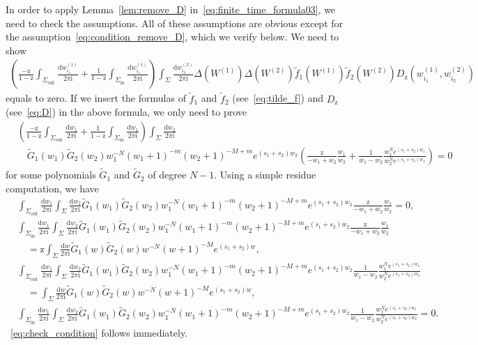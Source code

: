 \documentclass{article}
\numberwithin{equation}{section}
\newcommand{\ddbar}[2]{\frac{{\mathrm d}#1}{2\pi {\mathrm i}#2}}
\newcommand{\inn}{\mathrm{in}}
\newcommand{\out}{\mathrm{out}}
\newcommand{\rz}{\mathrm{z}}
\begin{document}
In order to apply Lemma~\ref{lem:remove_D} in~\eqref{eq:finite_time_formula03}, we need to check the assumptions. All of these assumptions are obvious except for the assumption~\eqref{eq:condition_remove_D}, which we verify below. We need to show
\begin{equation*}
	\begin{split}
	\left( \frac{-\rz}{1-\rz} \int_{\Sigma_{\out}}
	\ddbar{w_{i_1}^{(1)}}{}
	+\frac{1}{1-\rz}  \int_{\Sigma_{\inn}}
	\ddbar{w_{i_1}^{(1)}}{}
	\right)
	\int_{\Sigma} \ddbar{w_{i_2}^{(2)}}{}
	\Delta\left(W^{(1)}\right)
	\Delta\left(W^{(2)}\right)
	\tilde f_1\left( W^{(1)} \right)
	\tilde f_2\left( W^{(2)} \right)
	D_\rz\left(w_{i_1}^{(1)},w_{i_2}^{(2)}\right)
	\end{split}
\end{equation*}
equals to zero. If we insert the formulas of $\tilde f_1$ and $\tilde f_2$ (see~\eqref{eq:tilde_f}) and $D_\rz$ (see~\eqref{eq:D}) in the above formula, we only need to prove
\begin{equation}
	\label{eq:check_condition}
	\begin{split}
	&\left( \frac{-\rz}{1-\rz} \int_{\Sigma_{\out}}
	\ddbar{w_{1}}{}
	+\frac{1}{1-\rz}  \int_{\Sigma_{\inn}}
	\ddbar{w_1}{}
	\right)
	\int_{\Sigma} \ddbar{w_2}{}\\
	&\quad 
	\tilde G_1(w_1)\tilde G_2(w_2)
	w_1^{-N}(w_1+1)^{-m}
	(w_2+1)^{-M+m}e^{(s_1+s_2)w_2}	
	\left(
	\frac{ \rz } {-w_1+w_2}
	\frac{ w_1 } { w_2 }
	+  \frac{ 1 } {w_1-w_2}
	\frac{ w_1^{N} e^{(s_1+s_2) w_1} }
	{ w_2^{N} e^{(s_1+s_2) w_2} }
	\right)=0
	\end{split}
\end{equation}
for some polynomials $\tilde G_1$ and $\tilde G_2$ of degree $N-1$. Using a simple residue computation, we have
\begin{equation*}
	\begin{split}
		&\int_{\Sigma_\out}\ddbar{w_1}{}\int_\Sigma\ddbar{w_2}{}	\tilde G_1(w_1)\tilde G_2(w_2)
		w_1^{-N}(w_1+1)^{-m}
		(w_2+1)^{-M+m}e^{(s_1+s_2)w_2}	\frac{ \rz } {-w_1+w_2}
		\frac{ w_1 } { w_2 }=0,\\
		&\int_{\Sigma_\inn}\ddbar{w_1}{}\int_\Sigma\ddbar{w_2}{}	\tilde G_1(w_1)\tilde G_2(w_2)
		w_1^{-N}(w_1+1)^{-m}
		(w_2+1)^{-M+m}e^{(s_1+s_2)w_2}	\frac{ \rz } {-w_1+w_2}
		\frac{ w_1 } { w_2 }\\
		&\quad = \rz \int_\Sigma \ddbar{w}{} \tilde G_1(w) \tilde G_2(w) w^{-N} (w+1)^{-M} e^{(s_1+s_2)w},\\
		&\int_{\Sigma_\out}\ddbar{w_1}{}\int_\Sigma\ddbar{w_2}{}	\tilde G_1(w_1)\tilde G_2(w_2)
		w_1^{-N}(w_1+1)^{-m}
		(w_2+1)^{-M+m}e^{(s_1+s_2)w_2}	\frac{ 1 } {w_1-w_2}
		\frac{ w_1^N e^{(s_1+s_2)w_1} } { w_2^Ne^{(s_1+s_2)w_2} }\\
		&\quad =  \int_\Sigma \ddbar{w}{} \tilde G_1(w) \tilde G_2(w) w^{-N} (w+1)^{-M} e^{(s_1+s_2)w},\\
		&\int_{\Sigma_\inn}\ddbar{w_1}{}\int_\Sigma\ddbar{w_2}{}	\tilde G_1(w_1)\tilde G_2(w_2)
		w_1^{-N}(w_1+1)^{-m}
		(w_2+1)^{-M+m}e^{(s_1+s_2)w_2}	\frac{ 1 } {w_1-w_2}
		\frac{ w_1^N e^{(s_1+s_2)w_1} } { w_2^Ne^{(s_1+s_2)w_2} }=0.
	\end{split}
\end{equation*}
~\eqref{eq:check_condition} follows immediately.
\end{document}
